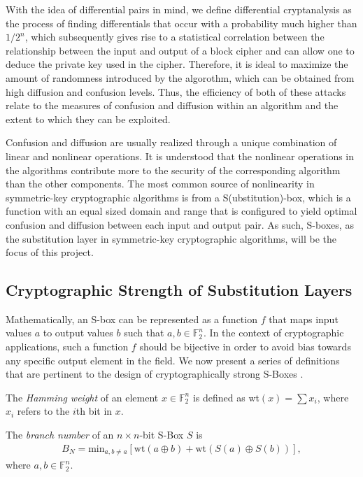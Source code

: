 \documentclass[11pt]{article}
\newcommand{\field}[1]{\mathbb{#1}} %
\begin{document}
With the idea of differential pairs in mind, we define differential cryptanalysis as the process of finding differentials that occur with a probability much higher than $1/2^n$, which subsequently gives rise to a statistical correlation between the relationship between the input and output of a block cipher and can allow one to deduce the private key used in the cipher. Therefore, it is ideal to maximize the amount of randomness introduced by the algorothm, which can be obtained from high diffusion and confusion levels. Thus, the efficiency of both of these attacks relate to the measures of confusion and diffusion within an algorithm and the extent to which they can be exploited. 

Confusion and diffusion are usually realized through a unique combination of linear and nonlinear operations. It is understood that the nonlinear operations in the algorithms contribute more to the security of the corresponding algorithm than the other components. The most common source of nonlinearity in symmetric-key cryptographic algorithms is from a S(ubstitution)-box, which is a function with an equal sized domain and range that is configured to yield optimal confusion and diffusion between each input and output pair. As such, S-boxes, as the substitution layer in symmetric-key cryptographic algorithms, will be the focus of this project. 

\subsection{Cryptographic Strength of Substitution Layers}
Mathematically, an S-box can be represented as a function $f$ that maps input values $a$ to output values $b$ such that $a,b \in \field{F}_2^n$. In the context of cryptographic applications, such a function $f$ should be bijective in order to avoid bias towards any specific output element in the field. We now present a series of definitions that are pertinent to the design of cryptographically strong S-Boxes \cite{Mar_newanalysis}.


\begin{define}
The \emph{Hamming weight} of an element $x \in \field{F}_2^n$ is defined as wt$(x) = \sum x_i$, where $x_i$ refers to the $i$th bit in $x$.
\end{define}

\begin{define}
The \emph{branch number} of an $n \times n$-bit S-Box $S$ is
\begin{eqnarray}
B_N = \text{min}_{a, b\not=a}\left[\text{wt}(a \oplus b) + \text{wt}(S(a) \oplus S(b))\right],
\end{eqnarray}
where $a, b \in \field{F}_2^n$.
\end{define}
\end{document}
